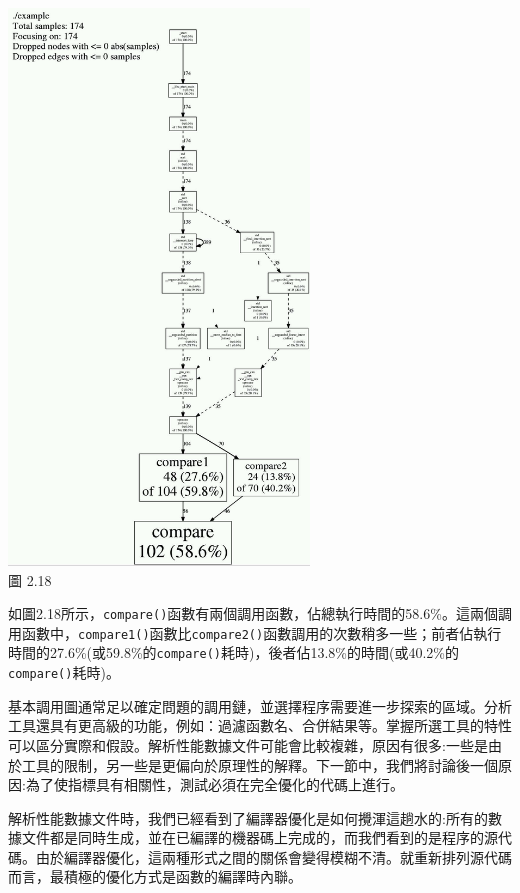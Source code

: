 \begin{center}
\includegraphics[width=0.6\textwidth]{content/1/chapter2/images/18.jpg}\\
圖 2.18
\end{center}

如圖2.18所示，\texttt{compare()}函數有兩個調用函數，佔總執行時間的58.6\%。這兩個調用函數中，\texttt{compare1()}函數比\texttt{compare2()}函數調用的次數稍多一些；前者佔執行時間的27.6\%(或59.8\%的\texttt{compare()}耗時)，後者佔13.8\%的時間(或40.2\%的\texttt{compare()}耗時)。

基本調用圖通常足以確定問題的調用鏈，並選擇程序需要進一步探索的區域。分析工具還具有更高級的功能，例如：過濾函數名、合併結果等。掌握所選工具的特性可以區分實際和假設。解析性能數據文件可能會比較複雜，原因有很多:一些是由於工具的限制，另一些是更偏向於原理性的解釋。下一節中，我們將討論後一個原因:為了使指標具有相關性，測試必須在完全優化的代碼上進行。


解析性能數據文件時，我們已經看到了編譯器優化是如何攪渾這趟水的:所有的數據文件都是同時生成，並在已編譯的機器碼上完成的，而我們看到的是程序的源代碼。由於編譯器優化，這兩種形式之間的關係會變得模糊不清。就重新排列源代碼而言，最積極的優化方式是函數的編譯時內聯。

